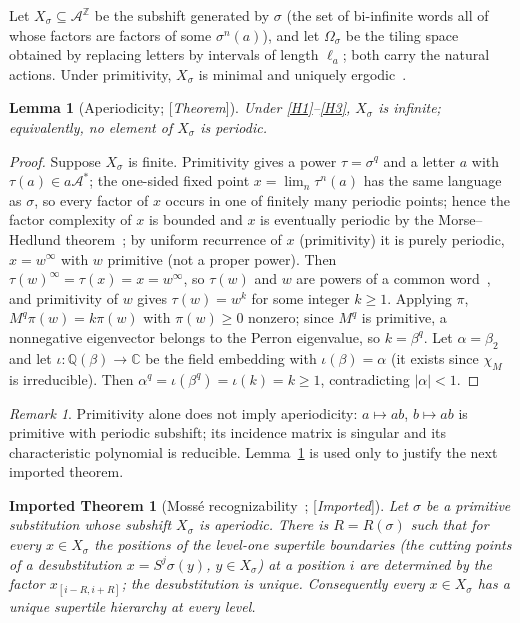 \documentclass[11pt]{amsart}
\theoremstyle{plain}
\newtheorem{lemma}[theorem]{Lemma}
\newtheorem{importedtheorem}[theorem]{Imported Theorem}
\theoremstyle{definition}
\theoremstyle{remark}
\newtheorem{remark}[theorem]{Remark}
\newcommand{\Z}{\mathbb{Z}}
\newcommand{\Q}{\mathbb{Q}}
\newcommand{\C}{\mathbb{C}}
\newcommand{\A}{\mathcal{A}}
\newcommand{\Status}[1]{\textup{[\textit{#1}]}}
\begin{document}
Let $X_\sigma\subseteq\A^{\Z}$ be the subshift generated by $\sigma$ (the set of bi-infinite words all of whose factors are factors of some $\sigma^n(a)$), and let $\Omega_\sigma$ be the tiling space obtained by replacing letters by intervals of length $\ell_a$; both carry the natural actions. Under primitivity, $X_\sigma$ is minimal and uniquely ergodic~\cite{Queffelec}.

\begin{lemma}[Aperiodicity; \Status{Theorem}]\label{lem:aperiodic}
Under \ref{H1}--\ref{H3}, $X_\sigma$ is infinite; equivalently, no element of $X_\sigma$ is periodic.
\end{lemma}
\begin{proof}
Suppose $X_\sigma$ is finite. Primitivity gives a power $\tau=\sigma^q$ and a letter $a$ with $\tau(a)\in a\A^*$; the one-sided fixed point $x=\lim_n\tau^n(a)$ has the same language as $\sigma$, so every factor of $x$ occurs in one of finitely many periodic points; hence the factor complexity of $x$ is bounded and $x$ is eventually periodic by the Morse--Hedlund theorem~\cite[Thm.~1.3.13]{Lothaire}; by uniform recurrence of $x$ (primitivity) it is purely periodic, $x=w^\infty$ with $w$ primitive (not a proper power). Then $\tau(w)^\infty=\tau(x)=x=w^\infty$, so $\tau(w)$ and $w$ are powers of a common word~\cite[Prop.~1.3.4]{Lothaire}, and primitivity of $w$ gives $\tau(w)=w^k$ for some integer $k\ge1$. Applying $\pi$, $M^q\pi(w)=k\pi(w)$ with $\pi(w)\ge0$ nonzero; since $M^q$ is primitive, a nonnegative eigenvector belongs to the Perron eigenvalue, so $k=\beta^q$. Let $\alpha=\beta_2$ and let $\iota:\Q(\beta)\to\C$ be the field embedding with $\iota(\beta)=\alpha$ (it exists since $\chi_M$ is irreducible). Then $\alpha^q=\iota(\beta^q)=\iota(k)=k\ge1$, contradicting $|\alpha|<1$.
\end{proof}

\begin{remark}
Primitivity alone does not imply aperiodicity: $a\mapsto ab$, $b\mapsto ab$ is primitive with periodic subshift; its incidence matrix is singular and its characteristic polynomial is reducible. Lemma~\ref{lem:aperiodic} is used only to justify the next imported theorem.
\end{remark}

\begin{importedtheorem}[Moss\'e recognizability~\cite{Mosse1,Mosse2}; \Status{Imported}]\label{thm:mosse}
Let $\sigma$ be a primitive substitution whose subshift $X_\sigma$ is aperiodic. There is $R=R(\sigma)$ such that for every $x\in X_\sigma$ the positions of the level-one supertile boundaries (the cutting points of a desubstitution $x=S^{j}\sigma(y)$, $y\in X_\sigma$) at a position $i$ are determined by the factor $x_{[i-R,i+R]}$; the desubstitution is unique. Consequently every $x\in X_\sigma$ has a unique supertile hierarchy at every level.
\end{importedtheorem}
\end{document}
